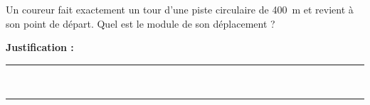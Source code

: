 Un coureur fait exactement un tour d'une piste circulaire de \qty{400}{m} et revient à son point de départ. Quel est le module de son déplacement ?

\choices

\noindent\textbf{Justification :} \hrulefill \\[2.5ex]
\rule{\linewidth}{0.4pt} \\[2.5ex]
\rule{\linewidth}{0.4pt}
\vfill
